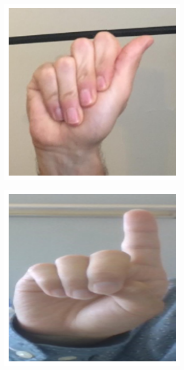 \begin{figure}[H]
  \centering
    \begin{subfigure}{0.22\textwidth}
      \includegraphics[width=\linewidth]{images/2-recunoasterea-asl/ctmx_mxup_orig_1.png}
      \caption{}
    \end{subfigure}
    \hspace{0.001\textwidth}
    \begin{subfigure}{0.22\textwidth}
      \includegraphics[width=\linewidth]{images/2-recunoasterea-asl/ctmx_mxup_orig_2.png}

\end{subfigure}
\end{figure}
